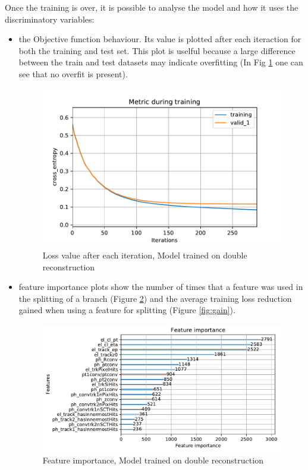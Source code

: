 \documentclass[a4paper, oneside, 11pt, openright]{book}
\begin{document}
			Once the training is over, it is possible to analyse the model and how it uses the discriminatory variables:
			\begin{itemize}
				\item the Objective function behaviour. Its value is plotted after each iteraction for both the training and test set. This plot is uselful because a large difference between the train and test datasets may indicate overfitting (In Fig \ref{fig:loss} one can see that no overfit is present).
				
				\begin{figure}[h!]
					\centering
					\includegraphics[width=.6\linewidth]{tesi_images/model_hyper_loss.pdf} 
					\caption{Loss value after each iteration, Model trained on double reconstruction}
					\label{fig:loss} 
				\end{figure}
				
				\item feature importance plots show the number of times that a feature was used in the splitting of a branch (Figure \ref{fig:importance}) and the average training loss reduction gained when using a feature for splitting (Figure \ref{fig:gain}).
				
				\begin{figure}[h!]
					\centering
					\includegraphics[width=.8\linewidth]{tesi_images/model_hyper_importance.pdf} 
					\caption{Feature importance, Model trained on double reconstruction}
					\label{fig:importance} 
				\end{figure}
				

\end{itemize}
\end{document}
